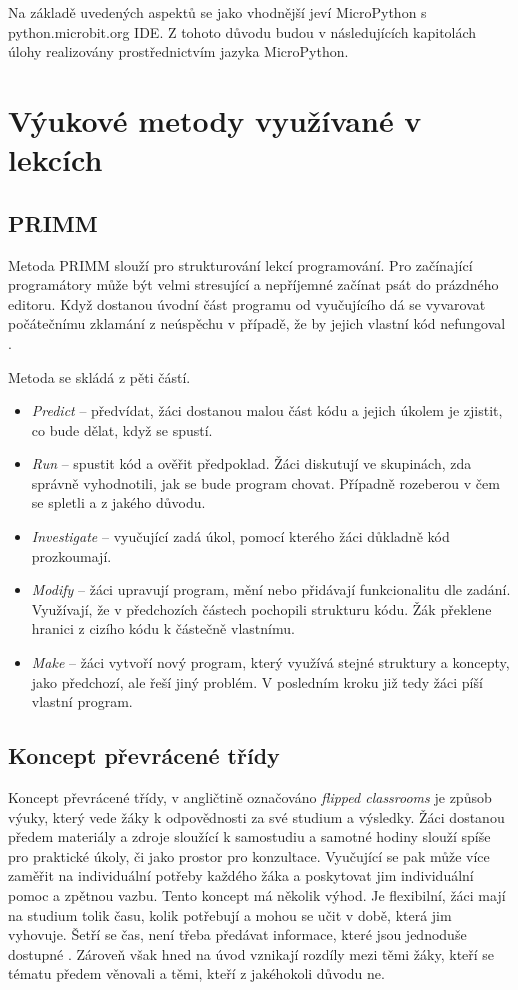 \documentclass[
  digital,     %
  oneside,     %
  nosansbold,  %
  colorbold, %
  lof,         %
  nolot,         %
]{fithesis4}
\begin{document}
Na základě uvedených aspektů se jako vhodnější jeví MicroPython s python.microbit.org IDE. Z tohoto důvodu budou v následujících kapitolách úlohy realizovány prostřednictvím jazyka MicroPython. 


\chapter{Výukové metody využívané v lekcích}

\section{PRIMM}
Metoda PRIMM slouží pro strukturování lekcí programování. Pro začínající programátory může být velmi stresující a nepříjemné začínat psát do prázdného editoru. Když dostanou úvodní část programu od vyučujícího dá se vyvarovat počátečnímu zklamání z neúspěchu v případě, že by jejich vlastní kód nefungoval \cite{hw}.

Metoda se skládá z pěti částí. 
\begin{itemize}
\item \textit{Predict} -- předvídat, žáci dostanou malou část kódu a jejich úkolem je zjistit, co bude dělat, když se spustí. 
\item \textit{Run} -- spustit kód a ověřit předpoklad. Žáci diskutují ve skupinách, zda správně vyhodnotili, jak se bude program chovat. Případně rozeberou v čem se spletli a z jakého důvodu. 
\item \textit{Investigate} -- vyučující zadá úkol, pomocí kterého žáci důkladně kód prozkoumají. 
\item \textit{Modify} -- žáci upravují program, mění nebo přidávají funkcionalitu dle zadání. Využívají, že v předchozích částech pochopili strukturu kódu. Žák překlene hranici z cizího kódu k částečně vlastnímu. 
\item \textit{Make} -- žáci vytvoří nový program, který využívá stejné struktury a koncepty, jako předchozí, ale řeší jiný problém. V posledním kroku již tedy žáci píší vlastní program.
\end{itemize}

\section{Koncept převrácené třídy}
Koncept převrácené třídy, v angličtině označováno \textit{flipped classrooms} je způsob výuky, který vede žáky k odpovědnosti za své studium a výsledky. 
Žáci dostanou předem materiály a zdroje sloužící k samostudiu a samotné hodiny slouží spíše pro praktické úkoly, či jako prostor pro konzultace. Vyučující se pak může více zaměřit na individuální potřeby každého žáka a poskytovat jim individuální pomoc a zpětnou vazbu.
Tento koncept má několik výhod. Je flexibilní, žáci mají na studium tolik času, kolik potřebují a mohou se učit v době, která jim vyhovuje. Šetří se čas, není třeba předávat informace, které jsou jednoduše dostupné \cite{mazur09}. Zároveň však hned na úvod vznikají rozdíly mezi těmi žáky, kteří se tématu předem věnovali a těmi, kteří z jakéhokoli důvodu ne.
\end{document}
